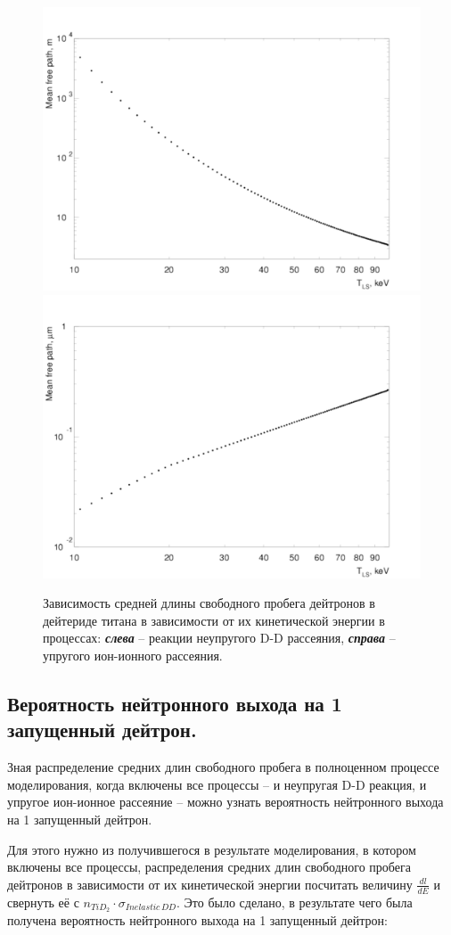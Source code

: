 \documentclass[a4paper,12pt]{article}
\begin{document}
\begin{large}
\begin{figure}[ht]
  {
     \includegraphics[width=0.5\linewidth]{images/fluence_inelastic.pdf}
     \includegraphics[width=0.5\linewidth]{images/fluence_elastic.pdf}
  }
  \caption{Зависимость средней длины свободного пробега дейтронов в дейтериде титана в зависимости от их кинетической энергии в процессах: \textbf{\textit{слева}} -- реакции неупругого D-D рассеяния, \textbf{\textit{справа}} -- упругого ион-ионного рассеяния.}
  \label{fig:RangesOfDeuteronsInInelasticAndElasticProcesses}
\end{figure}
	
\subsection{Вероятность нейтронного выхода на 1 запущенный дейтрон.}
\label{ProbabilityOfNeutronOutputPer1Deuteron}

	Зная распределение средних длин свободного пробега в полноценном процессе моделирования, когда включены все процессы -- и неупругая D-D реакция, и упругое ион-ионное рассеяние -- можно узнать вероятность нейтронного выхода на 1 запущенный дейтрон.
	
	Для этого нужно из получившегося в результате моделирования, в котором включены все процессы, распределения средних длин свободного пробега дейтронов в зависимости от их кинетической энергии посчитать величину $\frac{dl}{dE}$  и свернуть её с $n_{TiD_2} \cdot \sigma_{Inelastic\,DD}$. Это было сделано, в результате чего была получена вероятность нейтронного выхода на 1 запущенный дейтрон:
	

\end{large}
\end{document}
